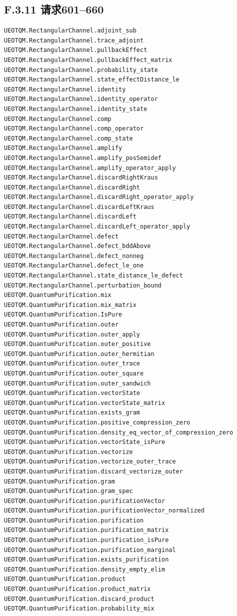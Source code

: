 \documentclass[
  11pt,
  oneside]{book}
\begin{document}
\hypertarget{f.3.11-ux8bf7ux6c42601660}{%
\subsection{F.3.11 请求601--660}\label{f.3.11-ux8bf7ux6c42601660}}

\begin{Verbatim}[breaklines,breakanywhere,fontsize=\scriptsize]
UEOTQM.RectangularChannel.adjoint_sub
UEOTQM.RectangularChannel.trace_adjoint
UEOTQM.RectangularChannel.pullbackEffect
UEOTQM.RectangularChannel.pullbackEffect_matrix
UEOTQM.RectangularChannel.probability_state
UEOTQM.RectangularChannel.state_effectDistance_le
UEOTQM.RectangularChannel.identity
UEOTQM.RectangularChannel.identity_operator
UEOTQM.RectangularChannel.identity_state
UEOTQM.RectangularChannel.comp
UEOTQM.RectangularChannel.comp_operator
UEOTQM.RectangularChannel.comp_state
UEOTQM.RectangularChannel.amplify
UEOTQM.RectangularChannel.amplify_posSemidef
UEOTQM.RectangularChannel.amplify_operator_apply
UEOTQM.RectangularChannel.discardRightKraus
UEOTQM.RectangularChannel.discardRight
UEOTQM.RectangularChannel.discardRight_operator_apply
UEOTQM.RectangularChannel.discardLeftKraus
UEOTQM.RectangularChannel.discardLeft
UEOTQM.RectangularChannel.discardLeft_operator_apply
UEOTQM.RectangularChannel.defect
UEOTQM.RectangularChannel.defect_bddAbove
UEOTQM.RectangularChannel.defect_nonneg
UEOTQM.RectangularChannel.defect_le_one
UEOTQM.RectangularChannel.state_distance_le_defect
UEOTQM.RectangularChannel.perturbation_bound
UEOTQM.QuantumPurification.mix
UEOTQM.QuantumPurification.mix_matrix
UEOTQM.QuantumPurification.IsPure
UEOTQM.QuantumPurification.outer
UEOTQM.QuantumPurification.outer_apply
UEOTQM.QuantumPurification.outer_positive
UEOTQM.QuantumPurification.outer_hermitian
UEOTQM.QuantumPurification.outer_trace
UEOTQM.QuantumPurification.outer_square
UEOTQM.QuantumPurification.outer_sandwich
UEOTQM.QuantumPurification.vectorState
UEOTQM.QuantumPurification.vectorState_matrix
UEOTQM.QuantumPurification.exists_gram
UEOTQM.QuantumPurification.positive_compression_zero
UEOTQM.QuantumPurification.density_eq_vector_of_compression_zero
UEOTQM.QuantumPurification.vectorState_isPure
UEOTQM.QuantumPurification.vectorize
UEOTQM.QuantumPurification.vectorize_outer_trace
UEOTQM.QuantumPurification.discard_vectorize_outer
UEOTQM.QuantumPurification.gram
UEOTQM.QuantumPurification.gram_spec
UEOTQM.QuantumPurification.purificationVector
UEOTQM.QuantumPurification.purificationVector_normalized
UEOTQM.QuantumPurification.purification
UEOTQM.QuantumPurification.purification_matrix
UEOTQM.QuantumPurification.purification_isPure
UEOTQM.QuantumPurification.purification_marginal
UEOTQM.QuantumPurification.exists_purification
UEOTQM.QuantumPurification.density_empty_elim
UEOTQM.QuantumPurification.product
UEOTQM.QuantumPurification.product_matrix
UEOTQM.QuantumPurification.discard_product
UEOTQM.QuantumPurification.probability_mix
\end{Verbatim}
\end{document}
